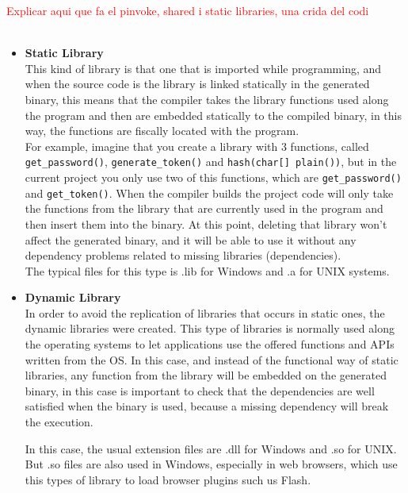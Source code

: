 \textcolor{red}{Explicar aqui que fa el pinvoke, shared i static libraries, una crida del codi}
\\
\\


\begin{itemize}
  \item 
  \textbf{Static Library}
  \\
  This kind of library is that one that is imported while programming, and when the source code is the library is linked statically in the generated binary, this means that the compiler takes the library functions used along the program and then are embedded statically to the compiled binary, in this way, the functions are fiscally located with the program. 
\\
For example, imagine that you create a library with 3 functions, called \verb!get_password()!, \verb!generate_token()! and \verb!hash(char[] plain())!,  but in the current project you only use two of this functions, which are \verb!get_password()! and \verb!get_token()!. When the compiler builds the project code will only take the functions from the library that are currently used in the program and then insert them into the binary. At this point, deleting that library won't affect the generated binary, and it will be able to use it without any dependency problems related to missing libraries (dependencies).
\\
The typical files for this type is .lib for Windows and .a for UNIX systems.
  
  \item
  \textbf{Dynamic Library}
  \\
  In order to avoid the replication of libraries that occurs in static ones, the dynamic libraries were created. This type of libraries is normally used along the operating systems to let applications use the offered functions and APIs written from the OS. In this case, and instead of the functional way of static libraries, any function from the library will be embedded on the generated binary, in this case is important to check that the dependencies are well satisfied when the binary is used, because a missing dependency will break the execution.

In this case, the usual extension files are .dll for Windows and .so for UNIX. But .so files are also used in Windows, especially in web browsers, which use this types of library to load browser plugins such us Flash.


\end{itemize}
